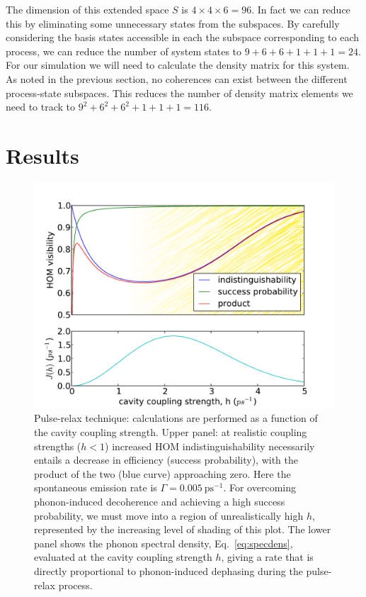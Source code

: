 The dimension of this extended space $S$ is $4 \times 4 \times 6 = 96$. In fact we can reduce this by eliminating some unnecessary states from the subspaces. By carefully considering the basis states accessible in each the subspace corresponding to each process, we can reduce the number of system states to $9 + 6 + 6 + 1 + 1 + 1 = 24$. For our simulation we will need to calculate the density matrix for this system. As noted in the previous section, no coherences can exist between the different process-state subspaces. This reduces the number of density matrix elements we need to track to $9^2 + 6^2 + 6^2 + 1 + 1 + 1 = 116$.

\section{Results}

\begin{figure}[htb]
  \begin{center}
  \includegraphics[width=12cm]{assets/2LS_plot.pdf}
  \end{center}
  \caption{Pulse-relax technique: calculations are performed as a function of the cavity coupling strength. Upper panel: at realistic coupling strengths ($h<1$) increased HOM indistinguishability necessarily entails a decrease in efficiency (success probability), with the product of the two (blue curve) approaching zero. Here the spontaneous emission rate is $\Gamma = 0.005~\mathrm{ps}^{-1}$. For overcoming phonon-induced decoherence and achieving a  high success probability, we must move into a region of unrealistically high $h$, represented by the increasing level of shading of this plot.
 The lower panel shows the phonon spectral density, Eq.~\ref{eq:specdens}, evaluated at the cavity coupling strength $h$, giving a rate that is directly proportional to phonon-induced dephasing during the pulse-relax process.
 }
  \label{2LS_plot}
\end{figure}

